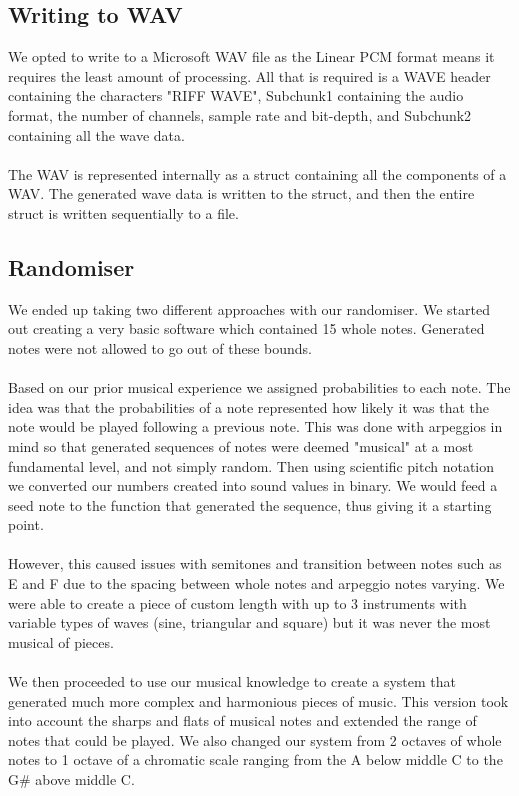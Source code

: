 \documentclass[11pt]{article}
\begin{document}
\subsection{Writing to WAV}
We opted to write to a Microsoft WAV file as the Linear PCM format means it requires the least amount of processing. All that is required is a WAVE header containing the characters "RIFF WAVE", Subchunk1 containing the audio format, the number of channels, sample rate and bit-depth, and Subchunk2 containing all the wave data.
\\\\
The WAV is represented internally as a struct containing all the components of a WAV. The generated wave data is written to the struct, and then the entire struct is written sequentially to a file.

\subsection{Randomiser}
We ended up taking two different approaches with our randomiser. We started out creating a very basic software which contained 15 whole notes. Generated notes were not allowed to go out of these bounds. 
\\\\
Based on our prior musical experience we assigned probabilities to each note. The idea was that the probabilities of a note represented how likely it was that the note would be played following a previous note. This was done with arpeggios in mind so that generated sequences of notes were deemed "musical" at a most fundamental level, and not simply random. Then using scientific pitch notation we converted our numbers created into sound values in binary. We would feed a seed note to the function that generated the sequence, thus giving it a starting point.
\\\\
However, this caused issues with semitones and transition between notes such as E and F due to the spacing between whole notes and arpeggio notes varying. We were able to create a piece of custom length with up to 3 instruments with variable types of waves (sine, triangular and square) but it was never the most musical of pieces.
\\\\
We then proceeded to use our musical knowledge to create a system that generated much more complex and harmonious pieces of music. This version took into account the sharps and flats of musical notes and extended the range of notes that could be played. We also changed our system from 2 octaves of whole notes to 1 octave of a chromatic scale ranging from the A below middle C to the G\# above middle C.
\end{document}
